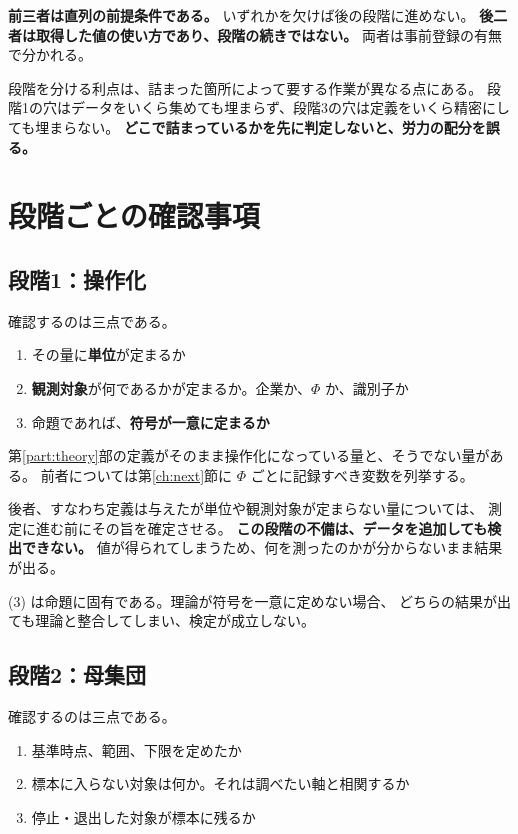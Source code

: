 \textbf{前三者は直列の前提条件である。} いずれかを欠けば後の段階に進めない。
\textbf{後二者は取得した値の使い方であり、段階の続きではない。}
両者は事前登録の有無で分かれる。

段階を分ける利点は、詰まった箇所によって要する作業が異なる点にある。
段階1の穴はデータをいくら集めても埋まらず、段階3の穴は定義をいくら精密にしても埋まらない。
\textbf{どこで詰まっているかを先に判定しないと、労力の配分を誤る。}

\section{段階ごとの確認事項}

\subsection{段階1：操作化}

確認するのは三点である。

\begin{enumerate}[label=(\arabic*)]
\item その量に\textbf{単位}が定まるか
\item \textbf{観測対象}が何であるかが定まるか。企業か、$\Phi$ か、識別子か
\item 命題であれば、\textbf{符号が一意に定まるか}
\end{enumerate}

第\ref{part:theory}部の定義がそのまま操作化になっている量と、そうでない量がある。
前者については第\ref{ch:next}節に $\Phi$ ごとに記録すべき変数を列挙する。

後者、すなわち定義は与えたが単位や観測対象が定まらない量については、
測定に進む前にその旨を確定させる。
\textbf{この段階の不備は、データを追加しても検出できない。}
値が得られてしまうため、何を測ったのかが分からないまま結果が出る。

(3) は命題に固有である。理論が符号を一意に定めない場合、
どちらの結果が出ても理論と整合してしまい、検定が成立しない。

\subsection{段階2：母集団}

確認するのは三点である。

\begin{enumerate}[label=(\arabic*)]
\item 基準時点、範囲、下限を定めたか
\item 標本に入らない対象は何か。それは調べたい軸と相関するか
\item 停止・退出した対象が標本に残るか
\end{enumerate}

